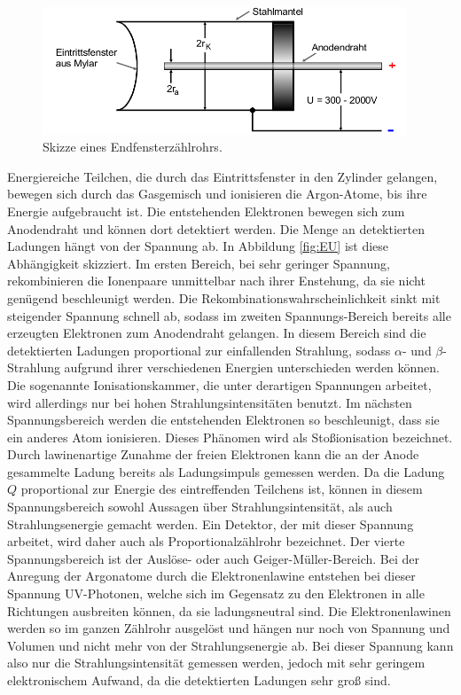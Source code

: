 \begin{figure}
  \centering
  \includegraphics[height=3.8cm]{MeinePics;)/GMZ.png}
  \caption{Skizze eines Endfensterzählrohrs.\cite{anleitung}}
  \label{fig:GMZ}
\end{figure}

\FloatBarrier

Energiereiche Teilchen, die durch das Eintrittsfenster in den Zylinder
gelangen,
bewegen sich durch das Gasgemisch und ionisieren die Argon-Atome,
bis ihre Energie aufgebraucht ist. Die entstehenden
Elektronen bewegen sich zum Anodendraht und können dort detektiert werden.
Die Menge an detektierten Ladungen hängt von der Spannung ab.
In Abbildung \ref{fig:EU} ist diese Abhängigkeit skizziert.
Im ersten Bereich, bei sehr geringer Spannung, rekombinieren die Ionenpaare
unmittelbar nach ihrer Enstehung, da sie nicht genügend beschleunigt werden.
Die Rekombinationswahrscheinlichkeit sinkt mit steigender Spannung schnell ab,
sodass im zweiten Spannungs-Bereich bereits alle erzeugten Elektronen zum
Anodendraht gelangen. In diesem Bereich sind die detektierten Ladungen
proportional zur einfallenden Strahlung, sodass $\alpha$- und $\beta$-Strahlung
aufgrund ihrer verschiedenen Energien unterschieden werden können.
Die sogenannte Ionisationskammer, die unter derartigen Spannungen
arbeitet, wird allerdings nur bei hohen Strahlungsintensitäten benutzt.
Im nächsten Spannungsbereich werden die entstehenden Elektronen so beschleunigt,
dass sie ein anderes Atom ionisieren. Dieses Phänomen wird als
Stoßionisation bezeichnet.
Durch lawinenartige Zunahme der freien Elektronen kann die an der Anode
gesammelte Ladung bereits als Ladungsimpuls gemessen werden. Da die
Ladung $Q$ proportional zur Energie des eintreffenden Teilchens ist, können
in diesem Spannungsbereich sowohl Aussagen über Strahlungsintensität, als auch
Strahlungsenergie gemacht werden. Ein Detektor, der mit dieser Spannung
arbeitet, wird daher auch als Proportionalzählrohr bezeichnet.
Der vierte Spannungsbereich ist der Auslöse- oder auch Geiger-Müller-Bereich.
Bei der Anregung der Argonatome durch die Elektronenlawine entstehen bei dieser
Spannung UV-Photonen, welche sich im Gegensatz zu den Elektronen in alle
Richtungen ausbreiten können, da sie ladungsneutral sind. Die Elektronenlawinen
werden so im ganzen Zählrohr ausgelöst und hängen nur noch von Spannung und
Volumen und nicht mehr von der Strahlungsenergie ab. Bei dieser Spannung
kann also nur die Strahlungsintensität gemessen werden, jedoch mit sehr
geringem elektronischem Aufwand, da die detektierten Ladungen sehr groß sind.

